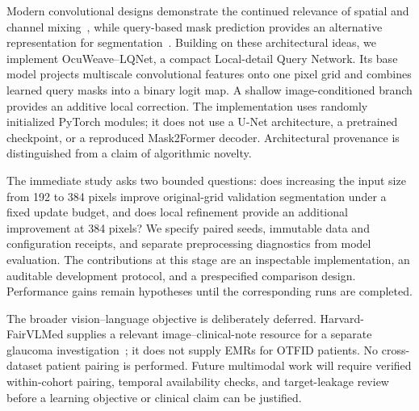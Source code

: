 Modern convolutional designs demonstrate the continued relevance of spatial and channel mixing~\cite{liu2022}, while query-based mask prediction provides an alternative representation for segmentation~\cite{cheng2022}. Building on these architectural ideas, we implement OcuWeave--LQNet, a compact Local-detail Query Network. Its base model projects multiscale convolutional features onto one pixel grid and combines learned query masks into a binary logit map. A shallow image-conditioned branch provides an additive local correction. The implementation uses randomly initialized PyTorch modules; it does not use a U-Net architecture, a pretrained checkpoint, or a reproduced Mask2Former decoder. Architectural provenance is distinguished from a claim of algorithmic novelty.

The immediate study asks two bounded questions: does increasing the input size from 192 to 384 pixels improve original-grid validation segmentation under a fixed update budget, and does local refinement provide an additional improvement at 384 pixels? We specify paired seeds, immutable data and configuration receipts, and separate preprocessing diagnostics from model evaluation. The contributions at this stage are an inspectable implementation, an auditable development protocol, and a prespecified comparison design. Performance gains remain hypotheses until the corresponding runs are completed.

The broader vision--language objective is deliberately deferred. Harvard-FairVLMed supplies a relevant image--clinical-note resource for a separate glaucoma investigation~\cite{luo2024}; it does not supply EMRs for OTFID patients. No cross-dataset patient pairing is performed. Future multimodal work will require verified within-cohort pairing, temporal availability checks, and target-leakage review before a learning objective or clinical claim can be justified.
